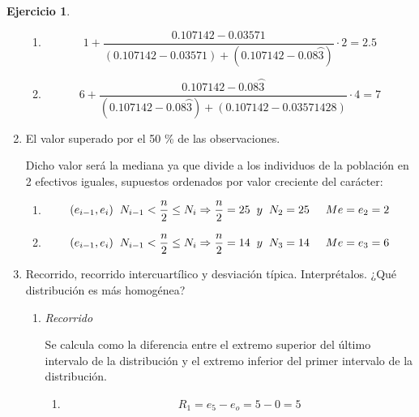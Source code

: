 \documentclass[a4paper, 12pt]{article}
\theoremstyle{definition}
\newtheorem{ej}{Ejercicio}
\begin{document}
\begin{ej}
\begin{enumerate}[label=\textit{\alph*)}]
    \begin{enumerate}[label=(\arabic*)]
        \item 
    \[
    1 + \frac{0.107142 - 0.03571}{(0.107142-0.03571) + (0.107142 - 0.08\wideparen{3})} \cdot 2 = 2.5
    \]
    
    \item
    \[
    6 + \frac{0.107142 - 0.08\wideparen{3}}{(0.107142-0.08\wideparen{3}) + (0.107142 - 0.03571428)} \cdot 4 = 7
    \]
    \end{enumerate}
    
    \item El valor superado por el 50 \% de las observaciones.
    
    Dicho valor será la mediana ya que divide a los individuos de la población en 2 efectivos iguales, supuestos ordenados por valor creciente del carácter:
    \begin{enumerate}[label=(\arabic*)]
        \item  
        \[
        (e_{i-1}, e_i) \hspace{0.2cm} N_{i-1} < \frac{n}{2} \leq N_i \Rightarrow \frac{n}{2} = 25 \hspace{0.2cm} y \hspace{0.2cm} N_2 = 25 \hspace{0.5cm} Me = e_2 = 2
        \]
        
        \item  
        \[
        (e_{i-1}, e_i) \hspace{0.2cm} N_{i-1} < \frac{n}{2} \leq N_i \Rightarrow \frac{n}{2} = 14 \hspace{0.2cm} y \hspace{0.2cm} N_3 = 14 \hspace{0.5cm} Me = e_3 = 6
        \]
    \end{enumerate}
    
    \item Recorrido, recorrido intercuartílico y desviación típica. Interprétalos. ¿Qué distribución es más homogénea?
    
    \begin{enumerate}[label=\arabic*)]
        \item \textit{Recorrido}
        
    Se calcula como la diferencia entre el extremo superior del último intervalo de la distribución y el extremo inferior del primer intervalo de la distribución.
    
    \begin{enumerate}[label=(\arabic*)]
        \item 
        \[
        R_1 = e_5 - e_o = 5 - 0 = 5
        \]
        

\end{enumerate}
\end{enumerate}
\end{enumerate}
\end{ej}
\end{document}
